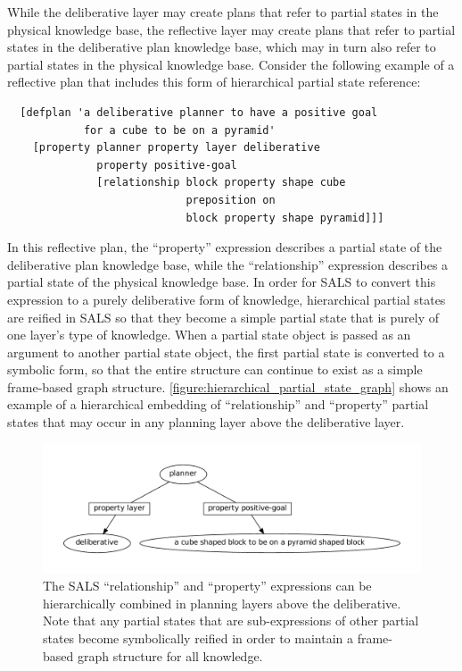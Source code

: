 While the deliberative layer may create plans that refer to partial
states in the physical knowledge base, the reflective layer may create
plans that refer to partial states in the deliberative plan knowledge
base, which may in turn also refer to partial states in the physical
knowledge base.  Consider the following example of a reflective plan
that includes this form of hierarchical partial state reference:
\begin{samepage}
\begin{Verbatim}
  [defplan 'a deliberative planner to have a positive goal
            for a cube to be on a pyramid'
    [property planner property layer deliberative
              property positive-goal
              [relationship block property shape cube
                            preposition on
                            block property shape pyramid]]]
\end{Verbatim}
\end{samepage}
In this reflective plan, the ``property'' expression describes a
partial state of the deliberative plan knowledge base, while the
``relationship'' expression describes a partial state of the physical
knowledge base.  In order for SALS to convert this expression to a
purely deliberative form of knowledge, hierarchical partial states are
reified in SALS so that they become a simple partial state that is
purely of one layer's type of knowledge.  When a partial state object
is passed as an argument to another partial state object, the first
partial state is converted to a symbolic form, so that the entire
structure can continue to exist as a simple frame-based graph
structure.  {\mbox{\autoref{figure:hierarchical_partial_state_graph}}}
shows an example of a hierarchical embedding of ``relationship'' and
``property'' partial states that may occur in any planning layer above
the deliberative layer.
\begin{figure}
\centering
\includegraphics[width=12cm]{gfx/hierarchical_partial_state_graph}
\caption[The SALS ``relationship'' and ``property'' expressions can be
  hierarchically combined in planning layers above the
  deliberative.]{The SALS ``relationship'' and ``property''
  expressions can be hierarchically combined in planning layers above
  the deliberative.  Note that any partial states that are
  sub-expressions of other partial states become symbolically reified
  in order to maintain a frame-based graph structure for all
  knowledge.}
\label{figure:hierarchical_partial_state_graph}
\end{figure}

